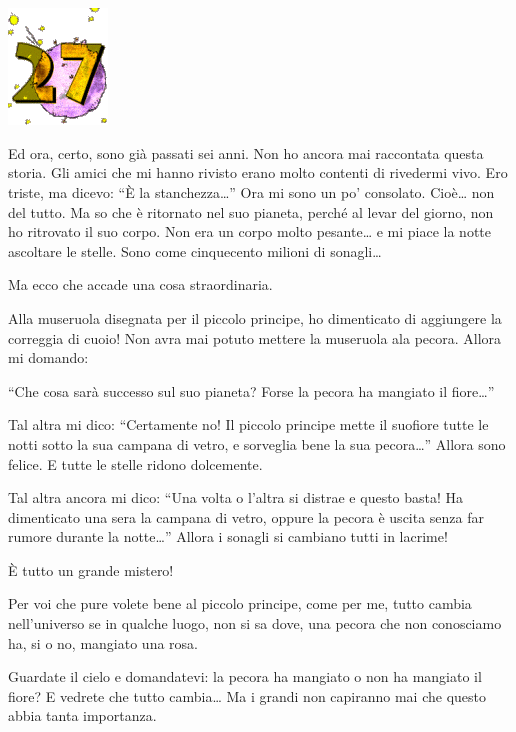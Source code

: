 \documentclass[11pt]{scrbook}
\begin{document}
\chapter{}
\begin{center}
\includegraphics{img/chapter27}
\end{center}

Ed ora, certo, sono già passati sei anni. Non ho ancora mai raccontata questa storia. Gli amici che mi hanno rivisto erano molto contenti di rivedermi vivo. Ero triste, ma dicevo: ``È la stanchezza\ldots{}'' Ora mi sono un po' consolato. Cioè\ldots{} non del tutto. Ma so che è ritornato nel suo pianeta, perché al levar del giorno, non ho ritrovato il suo corpo. Non era un corpo molto pesante\ldots{} e mi piace la
notte ascoltare le stelle. Sono come cinquecento milioni di sonagli\ldots{}

Ma ecco che accade una cosa straordinaria.

Alla museruola disegnata per il piccolo principe, ho dimenticato di aggiungere la correggia di cuoio! Non avra mai potuto mettere la museruola ala pecora. Allora mi domando:

``Che cosa sarà successo sul suo pianeta? Forse la pecora ha mangiato il fiore\ldots{}''

Tal altra mi dico: ``Certamente no! Il piccolo principe mette il suofiore tutte le notti sotto la sua campana di vetro, e sorveglia bene la sua pecora\ldots{}'' Allora sono felice. E tutte le stelle ridono dolcemente.

Tal altra ancora mi dico: ``Una volta o l'altra si distrae e questo basta! Ha dimenticato una sera la campana di vetro, oppure la pecora è uscita senza far rumore durante la notte\ldots{}'' Allora i sonagli si cambiano tutti in lacrime!

È tutto un grande mistero!

Per voi che pure volete bene al piccolo principe, come per me, tutto cambia nell'universo se in qualche luogo, non si sa dove, una pecora che non conosciamo ha, si o no, mangiato una rosa.

Guardate il cielo e domandatevi: la pecora ha mangiato o non ha mangiato il fiore? E vedrete che tutto cambia\ldots{} Ma i grandi non capiranno mai che questo abbia tanta importanza.
\end{document}
